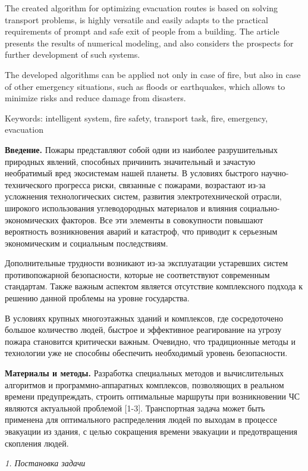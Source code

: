 The created algorithm for optimizing evacuation routes is based on
solving transport problems, is highly versatile and easily adapts to the
practical requirements of prompt and safe exit of people from a
building. The article presents the results of numerical modeling, and
also considers the prospects for further development of such systems.

The developed algorithms can be applied not only in case of fire, but
also in case of other emergency situations, such as floods or
earthquakes, which allows to minimize risks and reduce damage from
disasters.

Keywords: intelligent system, fire safety, transport task, fire,
emergency, evacuation

{\bfseries Введение.} Пожары представляют собой одни из наиболее
разрушительных природных явлений, способных причинить значительный и
зачастую необратимый вред экосистемам нашей планеты. В условиях быстрого
научно-технического прогресса риски, связанные с пожарами, возрастают
из-за усложнения технологических систем, развития электротехнической
отрасли, широкого использования углеводородных материалов и влияния
социально-экономических факторов. Все эти элементы в совокупности
повышают вероятность возникновения аварий и катастроф, что приводит к
серьезным экономическим и социальным последствиям.

Дополнительные трудности возникают из-за эксплуатации устаревших систем
противопожарной безопасности, которые не соответствуют современным
стандартам. Также важным аспектом является отсутствие комплексного
подхода к решению данной проблемы на уровне государства.

В условиях крупных многоэтажных зданий и комплексов, где сосредоточено
большое количество людей, быстрое и эффективное реагирование на угрозу
пожара становится критически важным. Очевидно, что традиционные методы и
технологии уже не способны обеспечить необходимый уровень безопасности.

{\bfseries Материалы и методы.} Разработка специальных методов и
вычислительных алгоритмов и программно-аппаратных комплексов,
позволяющих в реальном времени предупреждать, строить оптимальные
маршруты при возникновении ЧС являются актуальной проблемой {[}1-3{]}.
Транспортная задача может быть применена для оптимального распределения
людей по выходам в процессе эвакуации из здания, с целью сокращения
времени эвакуации и предотвращения скопления людей.

\emph{1. Постановка задачи}

